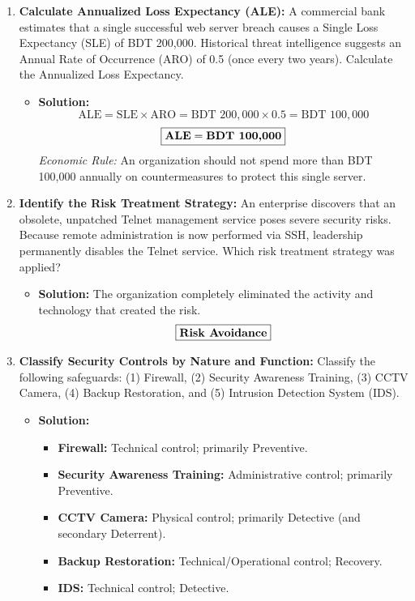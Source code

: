 \begin{enumerate}[label=\textbf{Problem \arabic*.},leftmargin=1.5cm]
\item \textbf{Calculate Annualized Loss Expectancy (ALE):}
A commercial bank estimates that a single successful web server breach causes a Single Loss Expectancy (SLE) of BDT 200,000. Historical threat intelligence suggests an Annual Rate of Occurrence (ARO) of 0.5 (once every two years). Calculate the Annualized Loss Expectancy.
\begin{itemize}
\item \textbf{Solution:}
\[ \text{ALE} = \text{SLE} \times \text{ARO} = \text{BDT } 200,000 \times 0.5 = \text{BDT } 100,000 \]
\[ \boxed{\text{\textbf{ALE}} = \textbf{BDT 100,000}} \]
\textit{Economic Rule:} An organization should not spend more than BDT 100,000 annually on countermeasures to protect this single server.
\end{itemize}

\item \textbf{Identify the Risk Treatment Strategy:}
An enterprise discovers that an obsolete, unpatched Telnet management service poses severe security risks. Because remote administration is now performed via SSH, leadership permanently disables the Telnet service. Which risk treatment strategy was applied?
\begin{itemize}
\item \textbf{Solution:} The organization completely eliminated the activity and technology that created the risk.
\[ \boxed{\text{\textbf{Risk Avoidance}}} \]
\end{itemize}

\item \textbf{Classify Security Controls by Nature and Function:}
Classify the following safeguards: (1) Firewall, (2) Security Awareness Training, (3) CCTV Camera, (4) Backup Restoration, and (5) Intrusion Detection System (IDS).
\begin{itemize}
\item \textbf{Solution:}
\begin{itemize}
\item \textbf{Firewall:} Technical control; primarily Preventive.
\item \textbf{Security Awareness Training:} Administrative control; primarily Preventive.
\item \textbf{CCTV Camera:} Physical control; primarily Detective (and secondary Deterrent).
\item \textbf{Backup Restoration:} Technical/Operational control; Recovery.
\item \textbf{IDS:} Technical control; Detective.
\end{itemize}
\end{itemize}
\end{enumerate}

